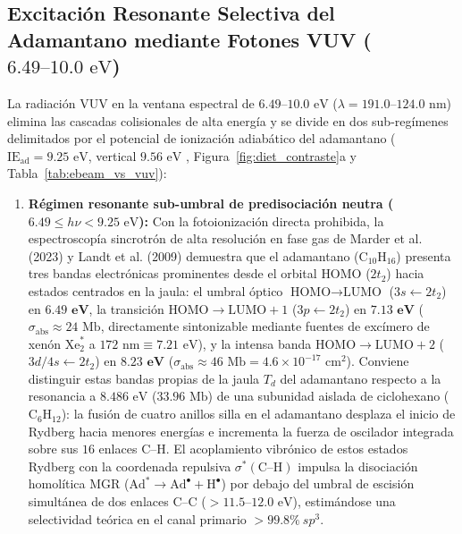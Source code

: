 \documentclass[10pt,twocolumn,a4paper]{article}
\begin{document}
\subsection{Excitación Resonante Selectiva del Adamantano mediante Fotones VUV ($6.49\text{--}10.0\text{ eV}$)}
La radiación VUV en la ventana espectral de $6.49\text{--}10.0\text{ eV}$ ($\lambda = 191.0\text{--}124.0\text{ nm}$) elimina las cascadas colisionales de alta energía y se divide en dos sub-regímenes delimitados por el potencial de ionización adiabático del adamantano ($\text{IE}_{\text{ad}} = 9.25\text{ eV}$, vertical $9.56\text{ eV}$ \cite{Landt2009,Marder2023}, Figura~\ref{fig:diet_contraste}a y Tabla~\ref{tab:ebeam_vs_vuv}):
\begin{enumerate}
    \item \textbf{Régimen resonante sub-umbral de predisociación neutra ($6.49 \le h\nu < 9.25\text{ eV}$):} Con la fotoionización directa prohibida, la espectroscopía sincrotrón de alta resolución en fase gas de Marder et al. (2023) \cite{Marder2023} y Landt et al. (2009) \cite{Landt2009} demuestra que el adamantano ($\text{C}_{10}\text{H}_{16}$) presenta tres bandas electrónicas prominentes desde el orbital $\text{HOMO}$ ($2t_2$) hacia estados centrados en la jaula: el umbral óptico $\text{HOMO}\to\text{LUMO}$ ($3s \leftarrow 2t_2$) en $\mathbf{6.49\text{ eV}}$, la transición $\text{HOMO}\to\text{LUMO}+1$ ($3p \leftarrow 2t_2$) en $\mathbf{7.13\text{ eV}}$ ($\sigma_{\text{abs}} \approx 24\text{ Mb}$, directamente sintonizable mediante fuentes de excímero de xenón $\text{Xe}_2^*$ a $172\text{ nm} \equiv 7.21\text{ eV}$), y la intensa banda $\text{HOMO}\to\text{LUMO}+2$ ($3d/4s \leftarrow 2t_2$) en $\mathbf{8.23\text{ eV}}$ ($\sigma_{\text{abs}} \approx 46\text{ Mb} = 4.6 \times 10^{-17}\text{ cm}^2$). Conviene distinguir estas bandas propias de la jaula $T_d$ del adamantano respecto a la resonancia a $8.486\text{ eV}$ ($33.96\text{ Mb}$) de una subunidad aislada de ciclohexano ($\text{C}_6\text{H}_{12}$): la fusión de cuatro anillos silla en el adamantano desplaza el inicio de Rydberg hacia menores energías e incrementa la fuerza de oscilador integrada sobre sus $16$ enlaces $\text{C--H}$. El acoplamiento vibrónico de estos estados Rydberg con la coordenada repulsiva $\sigma^*(\text{C--H})$ impulsa la disociación homolítica MGR ($\text{Ad}^* \to \text{Ad}^\bullet + \text{H}^\bullet$) por debajo del umbral de escisión simultánea de dos enlaces $\text{C--C}$ ($>11.5\text{--}12.0\text{ eV}$), estimándose una selectividad teórica en el canal primario $>99.8\%\ sp^3$.

\end{enumerate}
\end{document}
